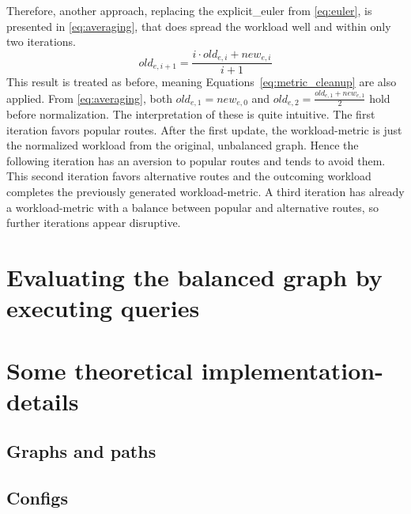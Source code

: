         Therefore, another approach, replacing the \gls{explicit_euler} from \vref{eq:euler}, is presented in \vref{eq:averaging}, that does spread the workload well and within only two iterations.
        \begin{equation}
        \label{eq:averaging}
            \mathit{old}_{e,i+1} = \frac{i \cdot \mathit{old}_{e,i} + \mathit{new}_{e,i}}{i+1}
        \end{equation}
        This result is treated as before, meaning Equations~\ref{eq:metric_cleanup} are also applied.
        From \vref{eq:averaging}, both $\mathit{old}_{e,1}=\mathit{new}_{e,0}$ and $\mathit{old}_{e,2}=\frac{\mathit{old}_{e,1} + \mathit{new}_{e,1}}{2}$ hold before normalization.
        The interpretation of these is quite intuitive.
        The first iteration favors popular routes.
        After the first update, the workload-\gls{metric} is just the normalized workload from the original, unbalanced graph.
        Hence the following iteration has an aversion to popular routes and tends to avoid them.
        This second iteration favors alternative routes and the outcoming workload completes the previously generated workload-\gls{metric}.
        A third iteration has already a workload-\gls{metric} with a balance between popular and alternative routes, so further iterations appear disruptive.

\section{Evaluating the balanced graph by executing queries}



\section{Some theoretical implementation-details}
\label{chap:balancing:implementation}


    \subsection{Graphs and paths}



    \subsection{Configs}

